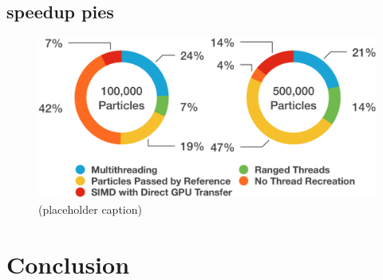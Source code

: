 \documentclass[11pt, a4paper, twocolumn]{article}
\begin{document}
\subsection{speedup pies}

\lipsum[1-1]

\begin{figure}[h]
\includegraphics[width=\linewidth]{speedup-pies}
\caption{(placeholder caption)}
\label{fig:speedup-pies}
\end{figure}

\section{Conclusion}






\end{document}
